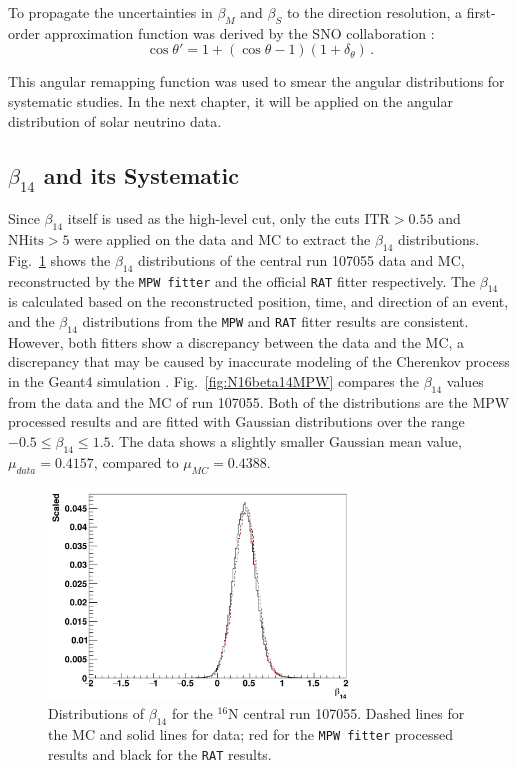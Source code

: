 To propagate the uncertainties in $\beta_M$ and $\beta_S$ to the direction resolution, a first-order approximation function was derived by the SNO collaboration \cite{drouin2012three}:
\begin{equation}\label{remapTheta}
\cos\theta'=1+(\cos\theta-1)(1+\delta_{\theta}) \, .
\end{equation}

This angular remapping function was used to smear the angular distributions for systematic studies. In the next chapter, it will be applied on the angular distribution of solar neutrino data. 

\subsection{$\beta_{14}$ and its Systematic}  \label{sect:beta14Systematics}

Since $\beta_{14}$ itself is used as the high-level cut, only the cuts $\mathrm{ITR}>0.55$ and $\mathrm{NHits}>5$ were applied on the data and MC to extract the $\beta_{14}$ distributions. Fig.~\ref{fig:N16beta14} shows the $\beta_{14}$ distributions of the central run 107055 data and MC, reconstructed by the \texttt{MPW fitter} and the official \texttt{RAT} fitter respectively. The $\beta_{14}$ is calculated based on the reconstructed position, time, and direction of an event, and the $\beta_{14}$ distributions from the \texttt{MPW} and \texttt{RAT} fitter results are consistent. However, both fitters show a discrepancy between the data and the MC, a discrepancy that may be caused by inaccurate modeling of the Cherenkov process in the Geant4 simulation \cite{dunmore2004separation,beta14discrepancy}. Fig.~\ref{fig:N16beta14MPW} compares the $\beta_{14}$ values from the data and the MC of run 107055. Both of the distributions are the MPW processed results and are fitted with Gaussian distributions over the range $-0.5 \le \beta_{14} \le 1.5$. The data shows a slightly smaller Gaussian mean value, $\mu_{data}=0.4157$, compared to $\mu_{MC}=0.4388$.

\begin{figure}[htbp]
	\centering
	\includegraphics[width=8cm]{N16_beta14_107055.png}
	\caption[Distributions of $\beta_{14}$ for the $^{16}$N central run 107055.]{Distributions of $\beta_{14}$ for the $^{16}$N central run 107055. Dashed lines for the MC and solid lines for data; red for the \texttt{MPW fitter} processed results and black for the \texttt{RAT} results. \label{fig:N16beta14}}
\end{figure}

